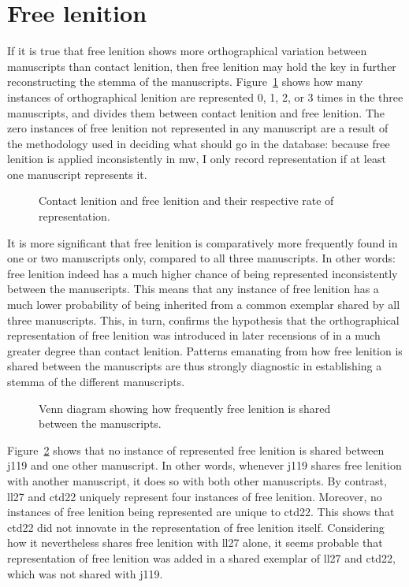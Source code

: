 \section{Free lenition}
\label{sec:points-where-one}
If it is true that free lenition shows more orthographical variation between manuscripts than contact lenition, then free lenition may hold the key in further reconstructing the stemma of the manuscripts. Figure~\ref{fig:contfreelendewi} shows how many instances of orthographical lenition are represented 0, 1, 2, or 3 times in the three manuscripts, and divides them between contact lenition and free lenition. The zero instances of free lenition not represented in any manuscript are a result of the methodology used in deciding what should go in the database: because free lenition is applied inconsistently in \gls{mw}, I only record representation if at least one manuscript represents it.

\begin{figure}[h]
  \centering
  
  \caption{Contact lenition and free lenition and their respective rate of representation.}
  \label{fig:contfreelendewi}
\end{figure}

It is more significant that free lenition is comparatively more frequently found in one or two manuscripts only, compared to all three manuscripts. In other words: free lenition indeed has a much higher chance of being represented inconsistently between the manuscripts. This means that any instance of free lenition has a much lower probability of being inherited from a common exemplar shared by all three manuscripts. This, in turn, confirms the hypothesis that the orthographical representation of free lenition was introduced in later recensions of  in a much greater degree than contact lenition. Patterns  emanating from how free lenition is shared between the manuscripts are thus strongly diagnostic in establishing a stemma of the different manuscripts.

\begin{figure}[h]
  \centering
  
  \caption{Venn diagram showing how frequently free lenition is shared between  the manuscripts.}
  \label{fig:vennfreelendewi}
\end{figure}
Figure~\ref{fig:vennfreelendewi} shows that no instance of represented free lenition  is shared between \gls{j119} and one other manuscript. In other words, whenever \gls{j119} shares free lenition with another manuscript, it does so with both other manuscripts. By contrast, \gls{ll27} and \gls{ctd22} uniquely represent four instances of free lenition. Moreover, no instances of free lenition being represented are unique to \gls{ctd22}. This shows that \gls{ctd22} did not innovate in the representation of free lenition itself. Considering how it nevertheless shares free lenition with \gls{ll27} alone, it seems probable that representation of free lenition was added in a shared exemplar of \gls{ll27} and \gls{ctd22}, which was not shared with \gls{j119}.

